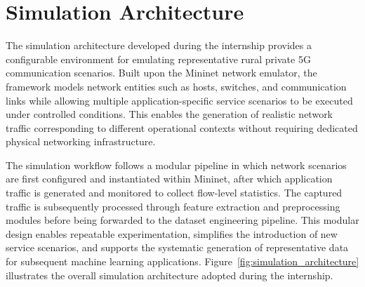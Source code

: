 \documentclass[12pt,a4paper]{report}
\begin{document}
	
	\section{Simulation Architecture}
	\label{sec:simulation_architecture}
	
	The simulation architecture developed during the internship provides a configurable environment for emulating representative rural private 5G communication scenarios. Built upon the Mininet network emulator, the framework models network entities such as hosts, switches, and communication links while allowing multiple application-specific service scenarios to be executed under controlled conditions. This enables the generation of realistic network traffic corresponding to different operational contexts without requiring dedicated physical networking infrastructure.
	
	The simulation workflow follows a modular pipeline in which network scenarios are first configured and instantiated within Mininet, after which application traffic is generated and monitored to collect flow-level statistics. The captured traffic is subsequently processed through feature extraction and preprocessing modules before being forwarded to the dataset engineering pipeline. This modular design enables repeatable experimentation, simplifies the introduction of new service scenarios, and supports the systematic generation of representative data for subsequent machine learning applications. Figure~\ref{fig:simulation_architecture} illustrates the overall simulation architecture adopted during the internship.
	
\end{document}
